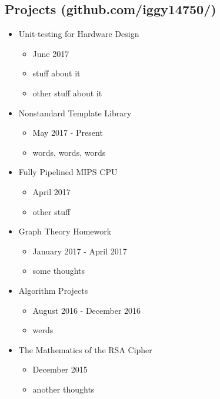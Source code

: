 \documentclass[18pt]{article}
\providecommand{\tightlist}{
    \setlength{\itemsep}{0pt}\setlength{\parskip}{0pt}
}
\begin{document}
  \subsection*{Projects (github.com/iggy14750/)}\label{projects}
    \begin{itemize}\tightlist
        
      \item Unit-testing for Hardware Design
      \begin{itemize}\tightlist
        \item June 2017
        \item stuff about it
        \item other stuff about it
      \end{itemize}
        
      \item Nonstandard Template Library
      \begin{itemize}\tightlist
        \item May 2017 - Present
        \item words, words, words
      \end{itemize}
          
      \item Fully Pipelined MIPS CPU
      \begin{itemize}\tightlist
        \item April 2017
        \item other stuff
      \end{itemize}
      
      \item Graph Theory Homework
      \begin{itemize}\tightlist
        \item January 2017 - April 2017
        \item some thoughts
      \end{itemize}
      
      \item Algorithm Projects
        \begin{itemize}\tightlist
          \item August 2016 - December 2016
          \item werds
        \end{itemize}
        
      
      \item The Mathematics of the RSA Cipher
      \begin{itemize}\tightlist
        \item December 2015
        \item another thoughts
      \end{itemize}
  \end{itemize}
    
\end{document}
